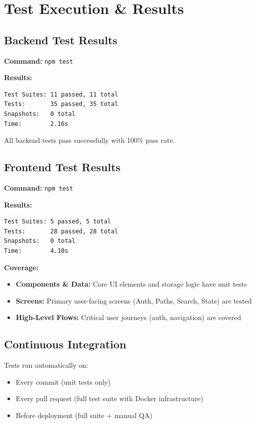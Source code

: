 \section{Test Execution \& Results}
\label{sec:test_execution}

\subsection{Backend Test Results}
\label{subsec:backend_test_results}

\textbf{Command:} \texttt{npm test}

\textbf{Results:}
\begin{verbatim}
Test Suites: 11 passed, 11 total
Tests:       35 passed, 35 total
Snapshots:   0 total
Time:        2.16s
\end{verbatim}

All backend tests pass successfully with 100\% pass rate.

\subsection{Frontend Test Results}
\label{subsec:frontend_test_results}

\textbf{Command:} \texttt{npm test}

\textbf{Results:}
\begin{verbatim}
Test Suites: 5 passed, 5 total
Tests:       28 passed, 28 total
Snapshots:   0 total
Time:        4.10s
\end{verbatim}

\textbf{Coverage:}
\begin{itemize}
    \item \textbf{Components \& Data:} Core UI elements and storage logic have unit tests
    \item \textbf{Screens:} Primary user-facing screens (Auth, Paths, Search, Stats) are tested
    \item \textbf{High-Level Flows:} Critical user journeys (auth, navigation) are covered
\end{itemize}

\subsection{Continuous Integration}
\label{subsec:ci_results}

Tests run automatically on:
\begin{itemize}
    \item Every commit (unit tests only)
    \item Every pull request (full test suite with Docker infrastructure)
    \item Before deployment (full suite + manual QA)
\end{itemize}

